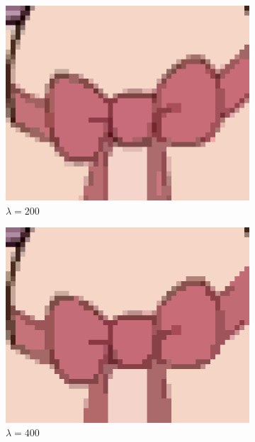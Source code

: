 \documentclass[10pt,twocolumn,letterpaper]{article}
\begin{document}
\begin{figure}
\begin{subfigure}{.48\linewidth}
\includegraphics[width=\linewidth]{alphaResults/bow_large_0200.png}
\caption{$\lambda = 200$}
\end{subfigure}
\begin{subfigure}{.48\linewidth}
\includegraphics[width=\linewidth]{alphaResults/bow_large_0400.png}
\caption{$\lambda = 400$}
\end{subfigure}
\begin{subfigure}{.48\linewidth}

\end{subfigure}
\end{figure}
\end{document}
